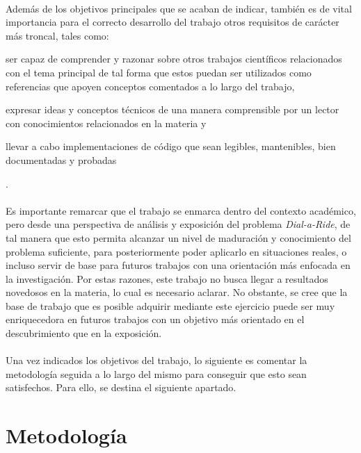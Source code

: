 \documentclass{subfiles}
\begin{document}
      \paragraph{}
      Además de los objetivos principales que se acaban de indicar, también es de vital importancia para el correcto desarrollo del trabajo otros requisitos de carácter más troncal, tales como: \begin{enumerate*}[label=(\alph*)] \item ser capaz de comprender y razonar sobre otros trabajos científicos relacionados con el tema principal de tal forma que estos puedan ser utilizados como referencias que apoyen conceptos comentados a lo largo del trabajo, \item expresar ideas y conceptos técnicos de una manera comprensible por un lector con conocimientos relacionados en la materia y \item llevar a cabo implementaciones de código que sean legibles, mantenibles, bien documentadas y probadas \end{enumerate*}.

      \paragraph{}
      Es importante remarcar que el trabajo se enmarca dentro del contexto académico, pero desde una perspectiva de análisis y exposición del problema \emph{Dial-a-Ride}, de tal manera que esto permita alcanzar un nivel de maduración y conocimiento del problema suficiente, para posteriormente poder aplicarlo en situaciones reales, o incluso servir de base para futuros trabajos con una orientación más enfocada en la investigación. Por estas razones, este trabajo no busca llegar a resultados novedosos en la materia, lo cual es necesario aclarar. No obstante, se cree que la base de trabajo que es posible adquirir mediante este ejercicio puede ser muy enriquecedora en futuros trabajos con un objetivo más orientado en el descubrimiento que en la exposición.

      \paragraph{}
      Una vez indicados los objetivos del trabajo, lo siguiente es comentar la metodología seguida a lo largo del mismo para conseguir que esto sean satisfechos. Para ello, se destina el siguiente apartado.

    \section{Metodología}
    \label{sec:introduction_metodology}
\end{document}
